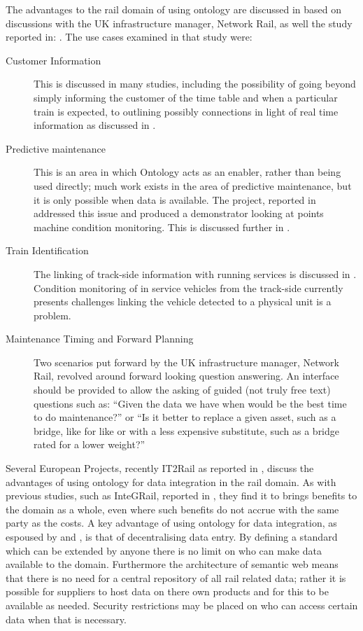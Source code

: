The advantages to the rail domain of using ontology are discussed in \cite{Morris} based on discussions with the UK infrastructure manager, Network Rail, as well the study reported in: \cite{Roberts2011}. The use cases examined in that study were:
\begin{description}
    \item[Customer Information] This is discussed in many studies, including the possibility of going beyond simply informing the customer of the time table and when a particular train is expected, to outlining possibly connections in light of real time information as discussed in \cite{Verstichel2014}. 
    \item[Predictive maintenance]
    This is an area in which Ontology acts as an enabler, rather than being used directly; much work exists in the area of predictive maintenance, but it is only possible when data is available. The project, reported in \cite{Tutcher2015a} addressed this issue and produced a demonstrator looking at points machine condition monitoring. This is discussed further in \cite{Umiliacchi2011}.
    \item[Train Identification]
    The linking of track-side information with running services is discussed in \cite{Morris}. Condition monitoring of in service vehicles from the track-side currently presents challenges linking the vehicle detected to a physical unit is a problem. 
    \item[Maintenance Timing and Forward Planning]
    Two scenarios put forward by the UK infrastructure manager, Network Rail, revolved around forward looking question answering. An interface should be provided to allow the asking of guided (not truly free text) questions such as: ``Given the data we have when would be the best time to do maintenance?'' or ``Is it better to replace a given asset, such as a bridge, like for like or with a less expensive substitute, such as a bridge rated for a lower weight?''    
\end{description}

Several European Projects, recently IT2Rail as reported in \cite{Gogos2016}, discuss the advantages of using ontology for data integration in the rail domain. As with previous studies, such as InteGRail, reported in \cite{Kopf2010}, they find it to brings benefits to the domain as a whole, even where such benefits do not accrue with the same party as the costs. A key advantage of using ontology for data integration, as espoused by \cite{Gogos2016} and \cite{Morris}, is that of decentralising data entry. By defining a standard which can be extended by anyone there is no limit on who can make data available to the domain. Furthermore the architecture of semantic web means that there is no need for a central repository of all rail related data; rather it is possible for suppliers to host data on there own products and for this to be available as needed. Security restrictions may be placed on who can access certain data when that is necessary.

